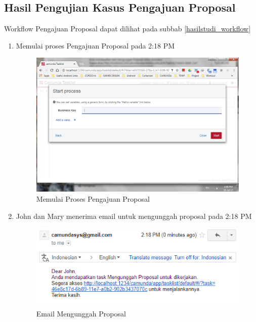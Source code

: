 \subsection{Hasil Pengujian Kasus Pengajuan Proposal}
\label{pengujian_kasus1}
Workflow Pengajuan Proposal dapat dilihat pada subbab \ref{hasilstudi_workflow}
\begin{enumerate}
	\item Memulai proses Pengajuan Proposal pada 2:18 PM
		\begin{figure}[H]
			\centering
			\includegraphics[scale=0.5]{Gambar/Bab-5/kasus1/1}
			\caption{Memulai Proses Pengajuan Proposal} 
			\label{fig:pengujian_kasus1_1}
	\end{figure}
	
		\item John dan Mary menerima email untuk mengunggah proposal pada 2:18 PM
		\begin{figure}[H]
			\centering
			\includegraphics[scale=0.8]{Gambar/Bab-5/kasus1/2}
			\caption{Email Mengunggah Proposal} 
			\label{fig:pengujian_kasus1_2}
	\end{figure}
	

\end{enumerate}

